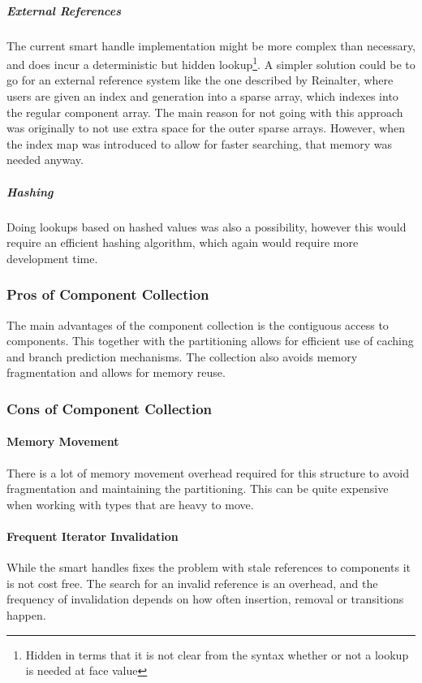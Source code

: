 \subparagraph{External References}
\label{subpar:detailed_component_collection_external_references}
The current smart handle implementation might be more complex than necessary, and does incur a deterministic but hidden lookup\footnote{Hidden in terms that it is not clear from the syntax whether or not a lookup is needed at face value}.
A simpler solution could be to go for an external reference system like the one described by Reinalter\cite{molecular_matters_dod_external_references},
where users are given an index and generation into a sparse array, which indexes into the regular component array.
The main reason for not going with this approach was originally to not use extra space for the outer sparse arrays.
However, when the index map was introduced to allow for faster searching, that memory was needed anyway.

\subparagraph{Hashing}
Doing lookups based on hashed values was also a possibility, however this would require an efficient hashing algorithm,
which again would require more development time.

\subsubsection{Pros of Component Collection}
The main advantages of the component collection is the contiguous access to components.
This together with the partitioning allows for efficient use of caching and branch prediction mechanisms.
The collection also avoids memory fragmentation and allows for memory reuse.

\subsubsection{Cons of Component Collection}
\paragraph{Memory Movement}
There is a lot of memory movement overhead required for this structure to avoid fragmentation and
maintaining the partitioning. This can be quite expensive when working with types that are heavy to move.

\paragraph{Frequent Iterator Invalidation}
While the smart handles fixes the problem with stale references to components it is not cost free.
The search for an invalid reference is an overhead, and the frequency of invalidation depends on how often insertion,
removal or transitions happen.


